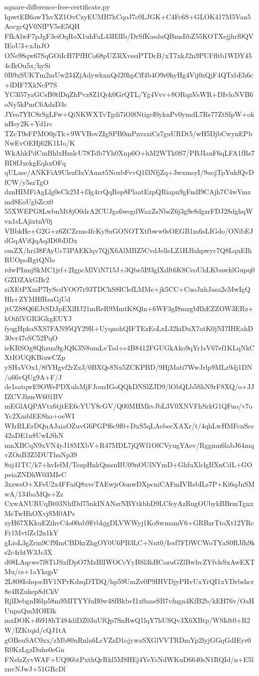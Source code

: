 \documentclass[11pt]{article}
\theoremstyle{definition}
\theoremstyle{remark}
\begin{document}
\begin{filecontents*}[overwrite]{square-difference-free-certificate.py}
hpwtEB6awThvXZ1OvCzyEUMB7hCqoJ7c0LJGK+C4Fc6S+GLOK417M5Van5AocgcQV0NfPV5eE5QH
FfkAlwF7pJgF3eiOqRoX1uhFaL43H3Ib/DrSfKasduQBmsIibZ55KOTXejjhrf0QVIEoU3+xJnJO
ONe98qw67SqGOiIcH7PfHCo68pUZ3lXvseiPTDcB/xT7xkJ2n9PUFfltb1WDY454cIkOu5x/hySi
0B9xSUKTm2mUw234ZjAdywknnQd20hpCff4b4O9r0hyHg4Vij0zQjF4QTxbEh6c+lDIF7XkNcP7S
YC3l57yaGCsB0tlDqZhPvz8Z1Qek0GrQTL/Yg4Vvv+8ORqnVsWR+DIvloNVB6oNy5kPmC6AdzD3c
JYeo7YIC8rSgLFw+QiNKWXTvTgdi7iOl8NtigeI0yknPv0ymdL7Rs77ZtSfpW+oknHey2K+Yd1rc
TZcT9sFPMO0pTk+9WVBovZIgSPB0mPnvsxiCz7guURDt5/wH5DjbCwynEPbNwEvOEHj62K1IJo/K
WkAhkPdCmBhlxHmlcU78Tdb7Yh0Xnp6O+hM2WTk0S7/PBJIauF6qLFA1fRs7BDffJxekgEqhxOFq
qULasc/ANKFiA9Ulezf3xVAmst5NoxbFvvQ1f3NfjZq+3wxmsyI/9uojTpYukfQvDfCW/y5szTgO
dznHIMFiAgLlg0eCk2M+f3g4rrQqRep8PlaatEzpQRiapn9gFndI9CAjh7C4wVmzmd8EoUgbZcx0
55XWEPG8LwbnMt8jO0drA2CUJga6wegdWaxZsNbsZ6j3g9e8dgzrFDJ28dghqWvn1sLAjixtnV0j
VBbkHe+G2G+z6ZCZrms4fcKySuGONOTXtfbww0sOEGB1m6sLIGdo/ONibEJdGqAViQqAq3D0bDDx
omZX/hri38FAyUc73PAEKlqv7QjX6AlMBZ5CvdJelleLZ1HJfahpwyc7Q8LquEIhRUOpoRgtQNlo
rdwPInnjSkMC1jrf+2IgpcMlViN715J+3Qbe5I93glXdft6K8CeoUhLKbuwklGupq0GZDZAkGBr2
ziXEtPXmP7IyScdYOO7r93TDChS8IClefLMMe+jk5CC+CuoJnhJasa2eMwIgQHh+ZYMHfRsaGjUd
jtCZ88Q6EJtSDJpEXlHJ21mReR9MmtK8Qln+6WF3gI8mzgbRhEZZOW3ERz+kOifilVGR3GkgEUYJ
fyqgHpkaSXS7FAN95QY29R+UyqnohQIFTEzEoLxL32kiDuX7atK0jNI7IHEahD30vr47eSC52PqO
ieKRSOg8Qhzua9gJQK3N8umLvTsd+c4B8412FGUGkAko9qYr1sV67ef1KLqNkCXtIOUQKBiuwCZp
ySHaVOx1/8fYHgvf2rZx3/0BXQs8Nx5ZCKPBD/9HjMati7WwJrlp9MLz9dj1DN/a66vQUg9A+F/J
de1satqwE9OWePDXulsMjFJouzIGoQQkDNSlZJD9/lObQLb5ShN9rF8XQ/o+JJIZCVJhusW601BV
mEGlAQPAVtx6tjtEE6cYUY8cGV/Q00MHMkvJbL3V0XNVFhSrkG1QFuo/v7oYc2XmblEE8ha+oeWI
WIrRLErDQuAJaiaOZuvG6PGPf6c9f0+DxS5qLAebecXAXr/t/4qhLwHMFcnScc42aDE1n8UwLShN
mnXBCqN9xVN4yJ18MXbV+R47MDL7jQWf1OlCVyugYAev/Rggmn6labJ64mqvZOnB3Z5DUThuNp39
8uj41TC/k7+hvIefM/TsupHnkQmsnBU09nOUlNYmD+GhfuXlclgIfXnCdL+GOpeiaZNDhW03MIeC
3xzwsO+XFeU2x4FFaiQ8xvcTAEwjrOonwDXpcniCAFmIVRsbILs7P+Ki6qJnSMwA/134baMQs+Zz
CxwANURUqBt03NhfDd75nkINANsrNBYtkbhD9LCfeyAzRugOUbykBBrmTgnxMsTwHhOXvjSM0APs
zyH67XKkuEZihvC4o00ab9FrbhjgDLVWWyj1KoSwmamV6+GRBzrTtoXt12YRcFr1MvtlZcl2n1kY
gLioL3gZrin9Cf9ImCBDkrZhgOY0U6PB3LC+Nut0/Icsf7FDWCWoTYaS0RJfh9ks2c4rhtW3Jc3X
d08LAqcwe7f8TiJSxfDpO7MzBlIWOCcYyBSl3hHCozuGZlBwhvZYfvlsSxAwEXTMu/cs+1aYkqpV
2L808IohqocBV1NPrKdzqDTDQ/hp59UmZv0P9IHVDjyPHvUxYrQI1xVDrbshcr8e4RZukep8dCkV
RjlDebgnB6lp58m9MITYYfuB0w48fBkbvI1x0aneSB7vfngn4KfB2b/kEH76v/OaHUnpaQmMOH3k
mxDOK+f6918hT484diDZ03uUfQp7SnRwQ1lqY7hUSQv3X6XBtp/WSIdt0+R2W/IZKtqid/cQJ1tA
gOBeuSAC0xx/zMb80uRnla6LcVZzD1ojywaSXGlVVTRDmYp2lyjGGqGdIEyr0R0KzLgzDuhe0eGn
FNelzZyvWAF+UQ96btPxthQrRkl5M8HEj4YeYsNdWKuD6640sN1RQId/n+E5lznvNJwJ+51GRcDl

\end{filecontents*}
\end{document}
